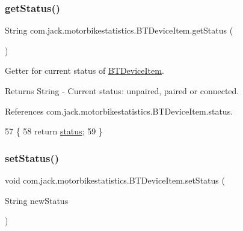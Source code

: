 \subsubsection{\texorpdfstring{get\+Status()}{getStatus()}}
{\footnotesize\ttfamily String com.\+jack.\+motorbikestatistics.\+B\+T\+Device\+Item.\+get\+Status (\begin{DoxyParamCaption}{ }\end{DoxyParamCaption})\hspace{0.3cm}{\ttfamily [inline]}}



Getter for current status of \hyperlink{classcom_1_1jack_1_1motorbikestatistics_1_1_b_t_device_item}{B\+T\+Device\+Item}. 

\begin{DoxyReturn}{Returns}
String -\/ Current status\+: unpaired, paired or connected. 
\end{DoxyReturn}


References com.\+jack.\+motorbikestatistics.\+B\+T\+Device\+Item.\+status.


\begin{DoxyCode}
57                               \{
58         \textcolor{keywordflow}{return} \hyperlink{classcom_1_1jack_1_1motorbikestatistics_1_1_b_t_device_item_ae7a8756973644c5719d5faddf3fa7946}{status};
59     \}
\end{DoxyCode}
\mbox{\label{classcom_1_1jack_1_1motorbikestatistics_1_1_b_t_device_item_a4e3d0774e91c5261963b03d6dcb08561}} 
\subsubsection{\texorpdfstring{set\+Status()}{setStatus()}}
{\footnotesize\ttfamily void com.\+jack.\+motorbikestatistics.\+B\+T\+Device\+Item.\+set\+Status (\begin{DoxyParamCaption}\item[{String}]{new\+Status }\end{DoxyParamCaption})\hspace{0.3cm}{\ttfamily [inline]}}



